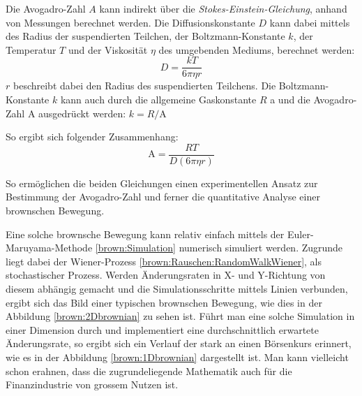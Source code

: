 Die Avogadro-Zahl $ A $ kann indirekt über die \textit{Stokes-Einstein-Gleichung}, anhand von Messungen berechnet werden. Die Diffusionskonstante $ D $ kann dabei mittels des Radius der suspendierten Teilchen, der Boltzmann-Konstante  $ k $, der Temperatur $ T $ und der Viskosität $ \eta $ des umgebenden Mediums, berechnet werden:
\begin{equation}
	D = \frac{kT}{6\pi\eta r}
\end{equation}
$ r $ beschreibt dabei den Radius des suspendierten Teilchens. Die Boltzmann-Konstante $ k $ kann auch durch die allgemeine Gaskonstante $ R $ a und die Avogadro-Zahl $ \mathrm{A} $ ausgedrückt werden: $ k = R/\mathrm{A} $

So ergibt sich folgender Zusammenhang:
\begin{equation}
	\mathrm{A} = \frac{R T}{D (6 \pi \eta r)}
\end{equation}

So ermöglichen die beiden Gleichungen einen experimentellen Ansatz zur Bestimmung der Avogadro-Zahl und ferner die quantitative Analyse einer brownschen Bewegung.


Eine solche brownsche Bewegung kann relativ einfach mittels der Euler-Maruyama-Methode \ref{brown:Simulation} numerisch simuliert werden. Zugrunde liegt dabei der Wiener-Prozess \ref{brown:Rauschen:RandomWalkWiener}, als stochastischer Prozess. Werden Änderungsraten in X- und Y-Richtung von diesem abhängig gemacht und die Simulationsschritte mittels Linien verbunden, ergibt sich das Bild einer typischen brownschen Bewegung, wie dies in der Abbildung \ref{brown:2Dbrownian} zu sehen ist. Führt man eine solche Simulation in einer Dimension durch und implementiert eine durchschnittlich erwartete Änderungsrate, so ergibt sich ein Verlauf der stark an einen Börsenkurs erinnert, wie es in der Abbildung \ref{brown:1Dbrownian} dargestellt ist. Man kann vielleicht schon erahnen, dass die zugrundeliegende Mathematik auch für die Finanzindustrie von grossem Nutzen ist.


